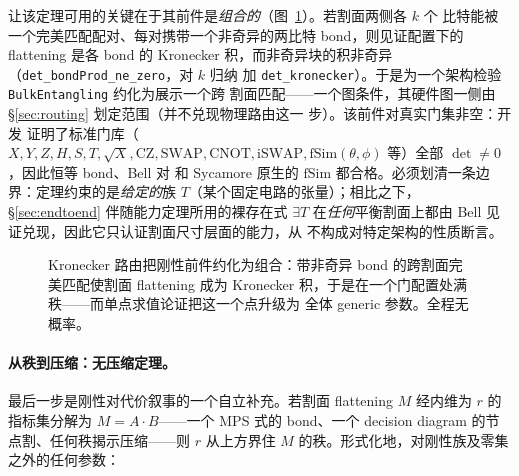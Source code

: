 \documentclass[11pt]{ctexart}
\begin{document}
让该定理可用的关键在于其前件是\emph{组合的}（图~\ref{fig:matching}）。若割面两侧各 $k$ 个
比特能被一个完美匹配配对、每对携带一个非奇异的两比特 bond，则见证配置下的 flattening 是各
bond 的 Kronecker 积，而非奇异块的积非奇异（\texttt{det\_bondProd\_ne\_zero}，对 $k$ 归纳
加 \texttt{det\_kronecker}）。于是为一个架构检验 \texttt{BulkEntangling} 约化为展示一个跨
割面匹配——一个图条件，其硬件图一侧由 \S\ref{sec:routing} 划定范围（并不兑现物理路由这一
步）。该前件对真实门集非空：开发
证明了标准门库（$X, Y, Z, H, S, T, \sqrt{X}, \mathrm{CZ}, \mathrm{SWAP}, \mathrm{CNOT},
\mathrm{iSWAP}, \mathrm{fSim}(\theta,\phi)$ 等）全部 $\det\neq 0$，因此恒等 bond、Bell 对
和 Sycamore 原生的 $\mathrm{fSim}$ 都合格。必须划清一条边界：定理约束的是\emph{给定的}族
$T$（某个固定电路的张量）；相比之下，\S\ref{sec:endtoend} 伴随能力定理所用的裸存在式
$\exists T$ 在\emph{任何}平衡割面上都由 Bell 见证兑现，因此它只认证割面尺寸层面的能力，从
不构成对特定架构的性质断言。

\begin{figure}[t]
\centering
{}
\caption{Kronecker 路由把刚性前件约化为组合：带非奇异 bond 的跨割面完美匹配使割面
flattening 成为 Kronecker 积，于是在一个门配置处满秩——而单点求值论证把这一个点升级为
全体 generic 参数。全程无概率。}
\label{fig:matching}
\end{figure}

\paragraph{从秩到压缩：无压缩定理。}
最后一步是刚性对代价叙事的一个自立补充。若割面 flattening $M$ 经内维为 $r$ 的指标集分解为
$M=A\cdot B$——一个 MPS 式的 bond、一个 decision diagram 的节点割、任何秩揭示压缩——则
$r$ 从上方界住 $M$ 的秩。形式化地，对刚性族及零集之外的任何参数：
\end{document}
